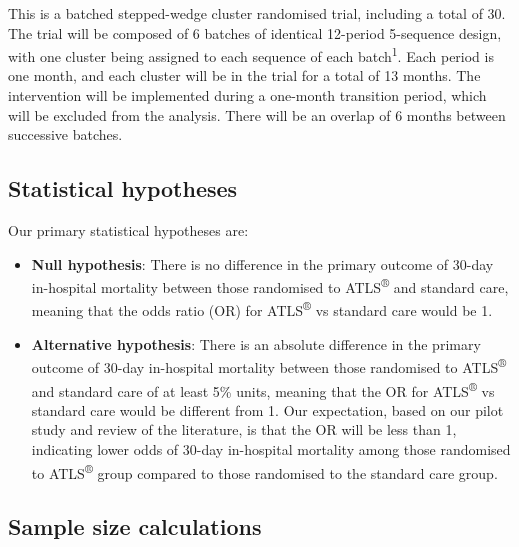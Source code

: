 \documentclass[
]{scrartcl}
\providecommand{\tightlist}{%
  \setlength{\itemsep}{0pt}\setlength{\parskip}{0pt}}\usepackage{longtable,booktabs,array}
\begin{document}
This is a batched stepped-wedge cluster randomised trial, including a
total of 30. The trial will be composed of 6 batches of identical
12-period 5-sequence design, with one cluster being assigned to each
sequence of each batch\textsuperscript{1}. Each period is one month, and
each cluster will be in the trial for a total of 13 months. The
intervention will be implemented during a one-month transition period,
which will be excluded from the analysis. There will be an overlap of 6
months between successive batches.

\hypertarget{statistical-hypotheses}{%
\subsection{Statistical hypotheses}\label{statistical-hypotheses}}

Our primary statistical hypotheses are:

\begin{itemize}
\tightlist
\item
  \textbf{Null hypothesis}: There is no difference in the primary
  outcome of 30-day in-hospital mortality between those randomised to
  ATLS\textsuperscript{®} and standard care, meaning that the odds ratio
  (OR) for ATLS\textsuperscript{®} vs standard care would be 1.
\item
  \textbf{Alternative hypothesis}: There is an absolute difference in
  the primary outcome of 30-day in-hospital mortality between those
  randomised to ATLS\textsuperscript{®} and standard care of at least
  5\% units, meaning that the OR for ATLS\textsuperscript{®} vs standard
  care would be different from 1. Our expectation, based on our pilot
  study and review of the literature, is that the OR will be less than
  1, indicating lower odds of 30-day in-hospital mortality among those
  randomised to ATLS\textsuperscript{®} group compared to those
  randomised to the standard care group.
\end{itemize}

\hypertarget{sample-size-calculations}{%
\subsection{Sample size calculations}\label{sample-size-calculations}}
\end{document}
